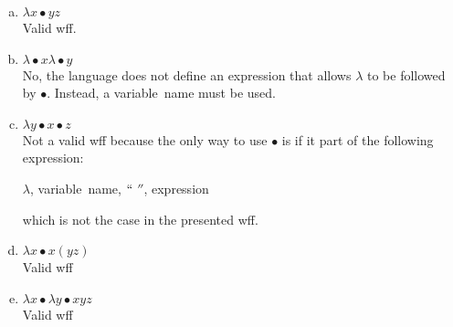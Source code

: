 \documentclass[11pt]{article}
\begin{document}
    \begin{enumerate}[(a)]
        \item $\lambda x \bullet yz$\\
        Valid wff.

        \item $\lambda \bullet x \lambda \bullet y$ \\
        No, the language does not define an expression that allows $\lambda $ to be followed by $ \bullet $. Instead, a variable~name must be used.

        \item $\lambda y \bullet x \bullet z$ \\
        Not a valid wff because the only way to use $ \bullet $ is if it part of the following expression:
        \begin{syntax}
            $\lambda $, variable~name, $``$ \bullet $''$, expression\\
        \end{syntax}
        which is not the case in the presented wff.

        \item $\lambda x \bullet x(yz)$\\
        Valid wff

        \item $\lambda x \bullet \lambda y \bullet xyz$\\
        Valid wff

    \end{enumerate}
\end{document}
